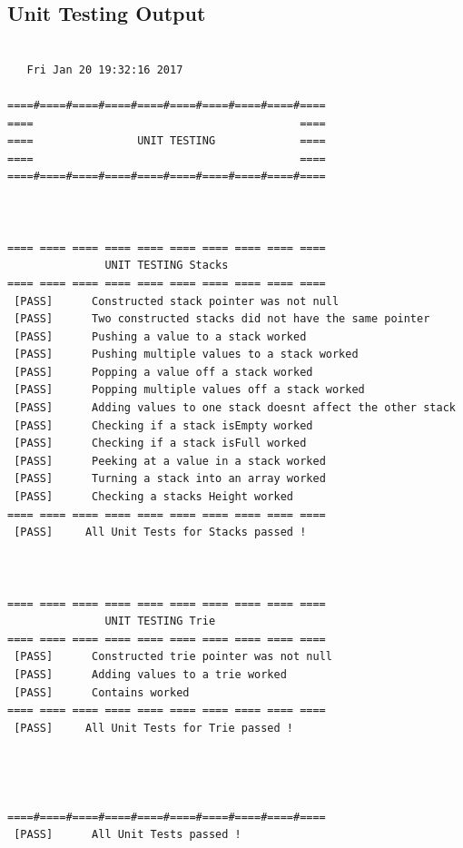 \documentclass[10pt]{article} %
\begin{document}
	\subsection{Unit Testing Output} \label{appendix:UnitTestOutput}
	    \begin{lstlisting}
	        
   Fri Jan 20 19:32:16 2017
 
====#====#====#====#====#====#====#====#====#==== 
====                                         ==== 
====                UNIT TESTING             ==== 
====                                         ==== 
====#====#====#====#====#====#====#====#====#==== 



==== ==== ==== ==== ==== ==== ==== ==== ==== ==== 
               UNIT TESTING Stacks 
==== ==== ==== ==== ==== ==== ==== ==== ==== ==== 
 [PASS] 	 Constructed stack pointer was not null
 [PASS] 	 Two constructed stacks did not have the same pointer
 [PASS] 	 Pushing a value to a stack worked
 [PASS] 	 Pushing multiple values to a stack worked
 [PASS] 	 Popping a value off a stack worked
 [PASS] 	 Popping multiple values off a stack worked
 [PASS] 	 Adding values to one stack doesnt affect the other stack
 [PASS] 	 Checking if a stack isEmpty worked
 [PASS] 	 Checking if a stack isFull worked
 [PASS] 	 Peeking at a value in a stack worked
 [PASS] 	 Turning a stack into an array worked
 [PASS] 	 Checking a stacks Height worked
==== ==== ==== ==== ==== ==== ==== ==== ==== ==== 
 [PASS] 	All Unit Tests for Stacks passed ! 



==== ==== ==== ==== ==== ==== ==== ==== ==== ==== 
               UNIT TESTING Trie 
==== ==== ==== ==== ==== ==== ==== ==== ==== ==== 
 [PASS] 	 Constructed trie pointer was not null
 [PASS] 	 Adding values to a trie worked
 [PASS] 	 Contains worked
==== ==== ==== ==== ==== ==== ==== ==== ==== ==== 
 [PASS] 	All Unit Tests for Trie passed ! 




====#====#====#====#====#====#====#====#====#==== 
 [PASS] 	 All Unit Tests passed ! 

        \end{lstlisting}
	\newpage
	
\end{document}
